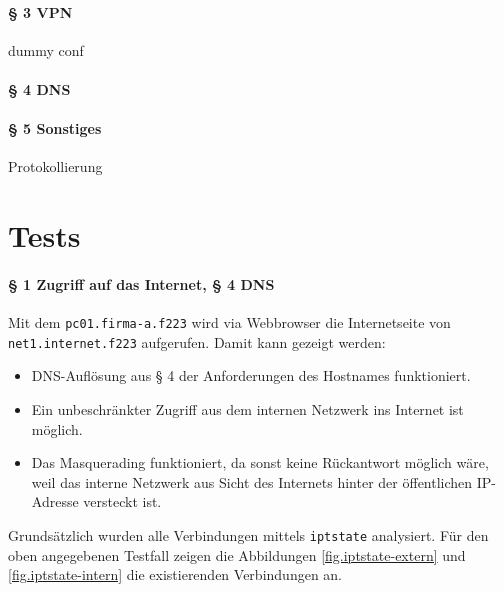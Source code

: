 \paragraph{§ 3 VPN}

dummy conf

\paragraph{§ 4 DNS}


\paragraph{§ 5 Sonstiges}


Protokollierung


\newpage
\section{Tests}\label{sec.tests}

\paragraph{§ 1 Zugriff auf das Internet, § 4 DNS}

Mit dem {\tt pc01.firma-a.f223} wird via Webbrowser die Internetseite
von {\tt net1.internet.f223} aufgerufen.
Damit kann gezeigt werden:
\begin{itemize}
  \item DNS-Auflösung aus § 4 der Anforderungen des Hostnames funktioniert.
  \item Ein unbeschränkter Zugriff aus dem internen Netzwerk ins Internet
        ist möglich.
  \item Das Masquerading funktioniert, da sonst keine Rückantwort möglich wäre,
        weil das interne Netzwerk aus Sicht des Internets hinter der
        öffentlichen IP-Adresse versteckt ist.
\end{itemize}

\noindent Grundsätzlich wurden alle Verbindungen mittels {\tt iptstate} analysiert.
Für den oben angegebenen Testfall zeigen die Abbildungen
\ref{fig.iptstate-extern} und \ref{fig.iptstate-intern} die existierenden
Verbindungen an.

